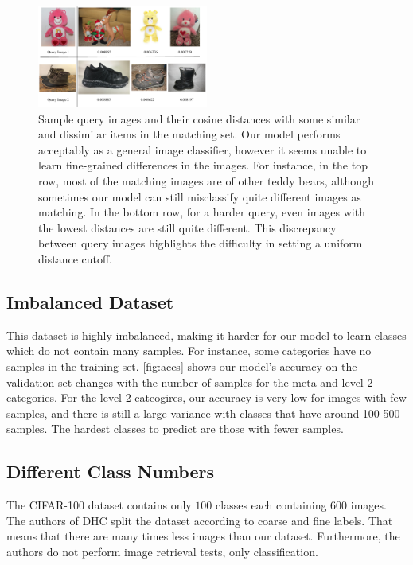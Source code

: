 \documentclass[conference]{IEEEtran}
\begin{document}
\begin{figure}[!t]
		\includegraphics[width=0.5\textwidth]{retrieval}
		\caption{Sample query images and their cosine distances with some similar and dissimilar items in the matching set.
				Our model performs acceptably as a general image classifier, however it seems unable to learn fine-grained differences in the images.
				For instance, in the top row, most of the matching images are
		of other teddy bears, although sometimes our model can still misclassify quite different images as matching.
		In the bottom row, for a harder query, even images with the lowest distances are still quite different.
		This discrepancy between query images highlights the difficulty in setting a uniform distance cutoff.
		}
		\label{fig:retrieval}
\end{figure}

\subsection{Imbalanced Dataset}
This dataset is highly imbalanced, making it harder for our model to learn classes which do not contain many 
samples.
For instance, some categories have no samples in the training set.
\figurename\ref{fig:accs} shows our model's accuracy on the validation set changes with the number of samples for the 
meta and level 2 categories.
For the level 2 cateogires, our accuracy is very low for images with few samples, and there is still a large variance
with classes that have around 100-500 samples.
The hardest classes to predict are those with fewer samples.


\subsection{Different Class Numbers}
The CIFAR-100 dataset contains only $100$ classes each containing $600$ images.
The authors of DHC split the dataset according to coarse and fine labels.
That means that there are many times less images than our dataset.
Furthermore, the authors do not perform image retrieval tests, only classification.
\end{document}
